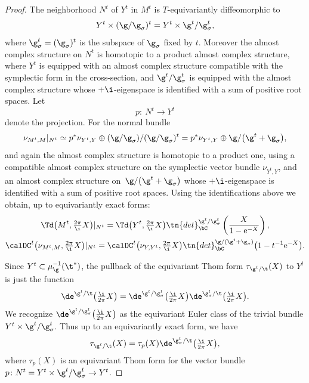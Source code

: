 \begin{proof}The neighborhood $N^t$ of $Y^t$ in $M^t$ is $T$-equivariantly diffeomorphic to
\[ Y^t \times (\g/\g_\sigma)^t=Y^t\times \g^t/\g_\sigma^t,\]
where $\g_\sigma^t=(\g_\sigma)^t$ is the subspace of $\g_\sigma$ fixed by $t$. Moreover the almost complex structure on $N^t$ is homotopic to a product almost complex structure, where $Y^t$ is equipped with an almost complex structure compatible with the symplectic form in the cross-section, and $\g^t/\g_\sigma^t$ is equipped with the almost complex structure whose $+\i$-eigenspace is identified with a sum of positive root spaces. Let
\[ p\colon \ N^t \rightarrow Y^t \]
denote the projection. For the normal bundle
\[ \nu_{M^t,M}|_{N^t} \simeq p^\ast \nu_{Y^t,Y}\oplus (\g/\g_\sigma)/(\g/\g_\sigma)^t=p^\ast \nu_{Y^t,Y}\oplus\g/\big(\g^t+\g_\sigma\big),\]
and again the almost complex structure is homotopic to a product one, using a compatible almost complex structure on the symplectic vector bundle $\nu_{Y^t,Y}$, and an almost complex structure on~$\g/\big(\g^t+\g_\sigma\big)$ whose $+\i$-eigenspace is identified with a sum of positive root spaces. Using the identifications above we obtain, up to equivariantly exact forms:
\begin{gather}\label{eqn:dec}
\Td\big(M^t,\tfrac{2\pi}{\i}X\big)|_{N^t} =\Td\big(Y^t,\tfrac{2\pi}{\i}X\big)\tn{det}_{\bC}^{\g^t/\g_\sigma^t}\left(\frac{X}{1-{\rm e}^{-X}}\right),\\ \nonumber
\calDC^t\big(\nu_{M^t,M},\tfrac{2\pi}{\i}X\big)|_{N^t} =\calDC^t\big(\nu_{Y,Y^t},\tfrac{2\pi}{\i}X\big)\tn{det}_{\bC}^{\g/(\g^t+\g_\sigma)}\big(1-t^{-1}{\rm e}^{-X}\big).
\end{gather}

Since $Y^t \subset \mu_\g^{-1}(\t^\ast)$, the pullback of the equivariant Thom form $\tau_{\g^t/\t}(X)$ to $Y^t$ is just the function
\[ \de^{\g^t/\t}\big(\tfrac{\i}{2\pi}X\big)=\de^{\g^t/\g_\sigma^t}\big(\tfrac{\i}{2\pi}X\big)\de^{\g_\sigma^t/\t}\big(\tfrac{\i}{2\pi}X\big).\]
We recognize $\de^{\g^t/\g_\sigma^t}\big(\tfrac{\i}{2\pi}X\big)$ as the equivariant Euler class of the trivial bundle $Y^t \times \g^t/\g_\sigma^t$. Thus up to an equivariantly exact form, we have{\samepage
\begin{gather}\label{eqn:dec2}
\tau_{\g^t/\t}(X)=\tau_p(X)\de^{\g_\sigma^t/\t}\big(\tfrac{\i}{2\pi}X\big),
\end{gather}
where $\tau_p(X)$ is an equivariant Thom form for the vector bundle $p\colon N^t=Y^t\times \g^t/\g_\sigma^t\rightarrow Y^t$.}


\end{proof}
